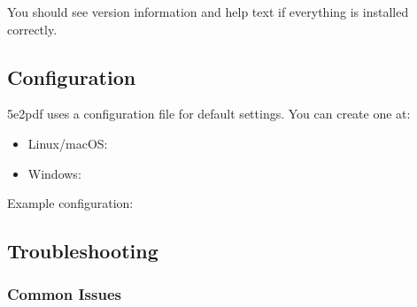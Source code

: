 \documentclass[letterpaper,10pt,english]{sphinxmanual}
\begin{document}
\sphinxAtStartPar
You should see version information and help text if everything is installed correctly.


\subsection{Configuration}
\label{\detokenize{user-guide/installation:configuration}}
\sphinxAtStartPar
5e2pdf uses a configuration file for default settings. You can create one at:
\begin{itemize}
\item {} 
\sphinxAtStartPar
Linux/macOS: 

\item {} 
\sphinxAtStartPar
Windows: 

\end{itemize}

\sphinxAtStartPar
Example configuration:

\begin{sphinxVerbatim}[commandchars=\\\{\}]


\PYG{p+pIndicator}{[}\PYG{p+pIndicator}{]}
\end{sphinxVerbatim}


\subsection{Troubleshooting}
\label{\detokenize{user-guide/installation:troubleshooting}}

\subsubsection{Common Issues}
\label{\detokenize{user-guide/installation:common-issues}}
\sphinxAtStartPar
{}
\end{document}
